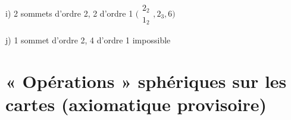 \documentclass[11pt,a4paper]{article}
\begin{document}
i) 2 sommets d'ordre 2, 2 d'ordre 1
 \quad $\bigl(\begin{smallmatrix}2_2\\1_2\end{smallmatrix}, 2_3, 6\bigr)$

j) 1 sommet d'ordre 2, 4 d'ordre 1 \quad impossible

\section{« Opérations » sphériques sur les cartes (axiomatique provisoire)}
\end{document}
